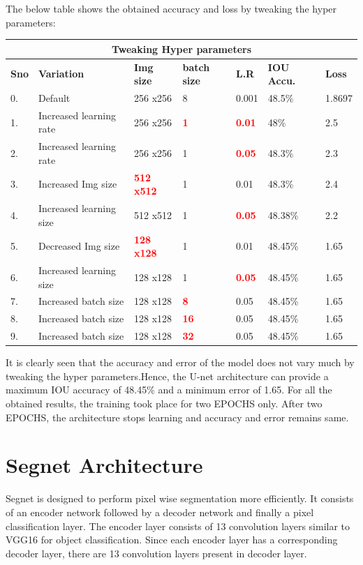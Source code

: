 \documentclass{IEEEtran}
\begin{document}
The below table shows the obtained accuracy and loss by tweaking the hyper parameters:

\begin{tabular}{ |p{0.6cm}|p{1.2cm}|p{0.6cm}|p{0.6cm}|p{0.6cm}|p{0.8cm}|p{0.8cm}|}
 \hline
 \multicolumn{7}{|c|}{\textbf{Tweaking Hyper parameters}} \\
 \hline
 \textbf{Sno} & \textbf{Variation} & \textbf{Img size} & \textbf{batch size} & \textbf{L.R} & \textbf{IOU Accu.} & \textbf{Loss} \\
 \hline
 0. & Default   & 256 x256    & 8  & 0.001 & 48.5\% & 1.8697 \\
 \hline
 1. & Increased learning rate   & 256 x256    & \textcolor{red}{\textbf{1}}  & \textcolor{red}{\textbf{0.01}} & 48\% & 2.5 \\
 \hline
 2. & Increased learning rate   & 256 x256    & 1  & \textcolor{red}{\textbf{0.05}} & 48.3\% & 2.3 \\
 \hline
 3. & Increased Img size   & \textcolor{red}{\textbf{512 x512}}    & 1  & 0.01 & 48.3\% & 2.4 \\
 \hline
 4. & Increased learning size   & 512 x512    & 1  & \textcolor{red}{\textbf{0.05}} & 48.38\% & 2.2 \\
 \hline
 5. & Decreased Img size   & \textcolor{red}{\textbf{128 x128}}    & 1  & 0.01 & 48.45\% & 1.65 \\
 \hline
 6. & Increased learning size   & 128 x128    & 1  & \textcolor{red}{\textbf{0.05}} & 48.45\% & 1.65 \\
 \hline
 7. & Increased batch size   & 128 x128    & \textcolor{red}{\textbf{8}}  & 0.05 & 48.45\% & 1.65 \\
 \hline
 8. & Increased batch size   & 128 x128    & \textcolor{red}{\textbf{16}}  & 0.05 & 48.45\% & 1.65 \\
 \hline
 9. & Increased batch size   & 128 x128    & \textcolor{red}{\textbf{32}}  & 0.05 & 48.45\% & 1.65 \\
 \hline
\end{tabular}
\newline

It is clearly seen that the accuracy and error of the model does not vary much by tweaking the hyper parameters.Hence, the U-net architecture can provide a maximum IOU accuracy of 48.45\% and a minimum error of 1.65. For all the obtained results, the training took place for two EPOCHS only. After two EPOCHS, the architecture stops learning and accuracy and error remains same.

\section{\textbf{Segnet Architecture}}
Segnet is designed to perform pixel wise segmentation more efficiently. It consists of an encoder network followed by a decoder network and finally a pixel classification layer. The encoder layer consists of 13 convolution layers similar to VGG16 for object classification. Since each encoder layer has a corresponding decoder layer, there are 13 convolution layers present in decoder layer.
\end{document}
